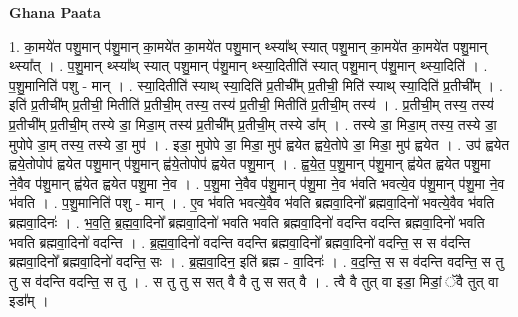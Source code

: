 \documentclass[17pt]{extarticle}
\begin{document}
\textbf{Ghana Paata } \newline

1. का॒मये॑त पशु॒मान् प॑शु॒मान् का॒मये॑त का॒मये॑त पशु॒मान् थ्स्या᳚थ् स्यात् पशु॒मान् का॒मये॑त का॒मये॑त पशु॒मान् थ्स्या᳚त् । . प॒शु॒मान् थ्स्या᳚थ् स्यात् पशु॒मान् प॑शु॒मान् थ्स्या॒दितीति॑ स्यात् पशु॒मान् प॑शु॒मान् थ्स्या॒दिति॑ । . प॒शु॒मानिति॑ पशु - मान् । . स्या॒दितीति॑ स्याथ् स्या॒दिति॑ प्र॒तीची᳚म् प्र॒तीची॒ मिति॑ स्याथ् स्या॒दिति॑ प्र॒तीची᳚म् । . इति॑ प्र॒तीची᳚म् प्र॒तीची॒ मितीति॑ प्र॒तीची॒म् तस्य॒ तस्य॑ प्र॒तीची॒ मितीति॑ प्र॒तीची॒म् तस्य॑ । . प्र॒तीची॒म् तस्य॒ तस्य॑ प्र॒तीची᳚म् प्र॒तीची॒म् तस्ये डा॒ मिडा॒म् तस्य॑ प्र॒तीची᳚म् प्र॒तीची॒म् तस्ये डा᳚म् । . तस्ये डा॒ मिडा॒म् तस्य॒ तस्ये डा॒ मुपोपे डा॒म् तस्य॒ तस्ये डा॒ मुप॑ । . इडा॒ मुपोपे डा॒ मिडा॒ मुप॑ ह्वयेत ह्वये॒तोपे डा॒ मिडा॒ मुप॑ ह्वयेत । . उप॑ ह्वयेत ह्वये॒तोपोप॑ ह्वयेत पशु॒मान् प॑शु॒मान् ह्व॑ये॒तोपोप॑ ह्वयेत पशु॒मान् । . ह्व॒ये॒त॒ प॒शु॒मान् प॑शु॒मान् ह्व॑येत ह्वयेत पशु॒मा ने॒वैव प॑शु॒मान् ह्व॑येत ह्वयेत पशु॒मा ने॒व । . प॒शु॒मा ने॒वैव प॑शु॒मान् प॑शु॒मा ने॒व भ॑वति भवत्ये॒व प॑शु॒मान् प॑शु॒मा ने॒व भ॑वति । . प॒शु॒मानिति॑ पशु - मान् । . ए॒व भ॑वति भवत्ये॒वैव भ॑वति ब्रह्मवा॒दिनो᳚ ब्रह्मवा॒दिनो॑ भवत्ये॒वैव भ॑वति ब्रह्मवा॒दिनः॑ । . भ॒व॒ति॒ ब्र॒ह्म॒वा॒दिनो᳚ ब्रह्मवा॒दिनो॑ भवति भवति ब्रह्मवा॒दिनो॑ वदन्ति वदन्ति ब्रह्मवा॒दिनो॑ भवति भवति ब्रह्मवा॒दिनो॑ वदन्ति । . ब्र॒ह्म॒वा॒दिनो॑ वदन्ति वदन्ति ब्रह्मवा॒दिनो᳚ ब्रह्मवा॒दिनो॑ वदन्ति॒ स स व॑दन्ति ब्रह्मवा॒दिनो᳚ ब्रह्मवा॒दिनो॑ वदन्ति॒ सः । . ब्र॒ह्म॒वा॒दिन॒ इति॑ ब्रह्म - वा॒दिनः॑ । . व॒द॒न्ति॒ स स व॑दन्ति वदन्ति॒ स तु तु स व॑दन्ति वदन्ति॒ स तु । . स तु तु स सत् वै वै तु स सत् वै । . त्वै वै तुत् वा इडा॒ मिडां॒ ॅवै तुत् वा इडा᳚म् । \newline
\end{document}
